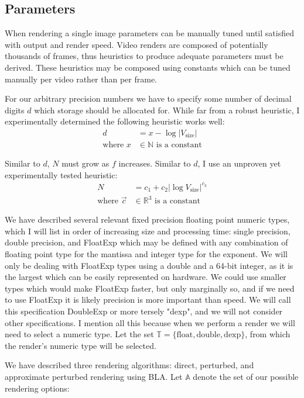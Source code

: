 \documentclass{article}
\begin{document}
\subsection{Parameters}
\par When rendering a single image parameters can be manually tuned until satisfied with output and render speed. Video renders are composed of potentially thousands of frames, thus heuristics to produce adequate parameters must be derived. These heuristics may be composed using constants which can be tuned manually per video rather than per frame.
\par For our arbitrary precision numbers we have to specify some number of decimal digits $d$ which storage should be allocated for. While far from a robust heuristic, I experimentally determined the following heuristic works well:
\[
\begin{aligned}
    d &= x - \log |V_\text{size}| \\
    \text{where } x &\in \mathbb{N} \text{ is a constant}
\end{aligned}
\]
\par Similar to $d$, $N$ must grow as $f$ increases. Similar to $d$, I use an unproven yet experimentally tested heuristic:
\[
\begin{aligned}
    N &= c_1+c_2 |\log{V_\text{size}}|^{c_3} \\
    \text{where } \vec{c} &\in \mathbb{R}^3 \text{ is a constant}
\end{aligned}
\]
\par We have described several relevant fixed precision floating point numeric types, which I will list in order of increasing size and processing time: single precision, double precision, and FloatExp which may be defined with any combination of floating point type for the mantissa and integer type for the exponent. We will only be dealing with FloatExp types using a double and a 64-bit integer, as it is the largest which can be easily represented on hardware. We could use smaller types which would make FloatExp faster, but only marginally so, and if we need to use FloatExp it is likely precision is more important than speed. We will call this specification DoubleExp or more tersely "dexp", and we will not consider other specifications. I mention all this because when we perform a render we will need to select a numeric type. Let the set $\mathbb{T}=\{\textrm{float}, \textrm{double}, \textrm{dexp}\}$, from which the render's numeric type will be selected.
\par We have described three rendering algorithms: direct, perturbed, and approximate perturbed rendering using BLA. Let $\mathbb{A}$ denote the set of our possible rendering options:
\end{document}

